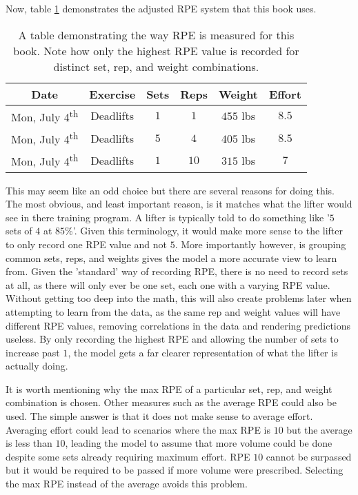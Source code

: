 Now, table \ref{tab:NonStandardRPEExample} demonstrates the adjusted RPE system that this book uses.

\begin{table}[h]
	\centering
	\begin{tabular}{c|c|c|c|c|c}
		Date & Exercise & Sets & Reps & Weight & Effort \\
        \hline
        Mon, July 4\textsuperscript{th} & Deadlifts & $1$ & $1$ & $455$ lbs & $8.5$ \\
        Mon, July 4\textsuperscript{th} & Deadlifts & $5$ & $4$ & $405$ lbs & $8.5$ \\
        Mon, July 4\textsuperscript{th} & Deadlifts & $1$ & $10$ & $315$ lbs & $7$ \\
	\end{tabular}
	\caption{A table demonstrating the way RPE is measured for this book. Note how only the highest RPE value is recorded for distinct set, rep, and weight combinations.}
	\label{tab:NonStandardRPEExample}
\end{table}

This may seem like an odd choice but there are several reasons for doing this. The most obvious, and least important reason, is it matches what the lifter would see in there training program. A lifter is typically told to do something like '$5$ sets of $4$ at $85$\%'. Given this terminology, it would make more sense to the lifter to only record one RPE value and not $5$. More importantly however, is grouping common sets, reps, and weights gives the model a more accurate view to learn from. Given the 'standard' way of recording RPE, there is no need to record sets at all, as there will only ever be one set, each one with a varying RPE value. Without getting too deep into the math, this will also create problems later when attempting to learn from the data, as the same rep and weight values will have different RPE values, removing correlations in the data and rendering predictions useless. By only recording the highest RPE and allowing the number of sets to increase past $1$, the model gets a far clearer representation of what the lifter is actually doing.

It is worth mentioning why the max RPE of a particular set, rep, and weight combination is chosen. Other measures such as the average RPE could also be used. The simple answer is that it does not make sense to average effort. Averaging effort could lead to scenarios where the max RPE is $10$ but the average is less than $10$, leading the model to assume that more volume could be done despite some sets already requiring maximum effort. RPE $10$ cannot be surpassed but it would be required to be passed if more volume were prescribed. Selecting the max RPE instead of the average avoids this problem.


